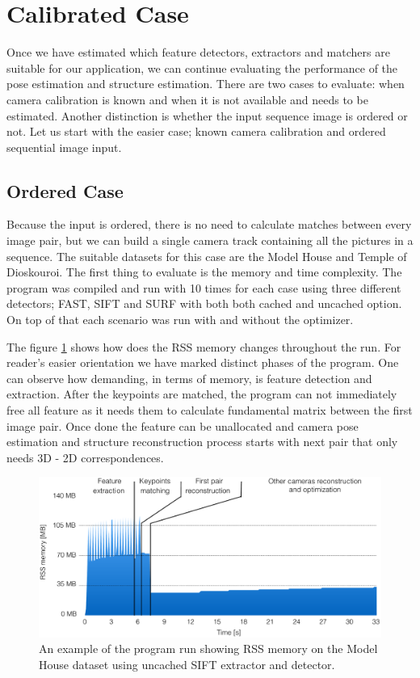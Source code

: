 \section{Calibrated Case}
\label{sec:experiments-calibrated}
Once we have estimated which feature detectors, extractors and matchers are suitable for our application, we can continue evaluating the performance of the pose estimation and structure estimation. There are two cases to evaluate: when camera calibration is known and when it is not available and needs to be estimated.  Another distinction is whether the input sequence image is ordered or not. Let us start with the easier case; known camera calibration and ordered sequential image input.

\subsection*{Ordered Case}
\label{sub:ordered_case}
Because the input is ordered, there is no need to calculate matches between every image pair, but we can build a single camera track containing all the pictures in a sequence. The suitable datasets for this case are the Model House and Temple of Dioskouroi. The first thing to evaluate is the memory and time complexity. The program was compiled and run with 10 times for each case using three different detectors; FAST, SIFT and SURF with both both cached and uncached option. On top of that each scenario was run with and without the optimizer. 

The figure \ref{fig:rss_memory} shows how does the RSS memory changes throughout the run. For reader's easier orientation we have marked distinct phases of the program. One can observe how demanding, in terms of memory, is feature detection and extraction. After the keypoints are matched, the program can not immediately free all feature as it needs them to calculate fundamental matrix between the first image pair. Once done the feature can be unallocated and camera pose estimation and structure reconstruction process starts with next pair that only needs 3D - 2D correspondences.

\begin{figure}[!htbp]
	\begin{center}
		\includegraphics[keepaspectratio,width=\textwidth]{fig/exp_model_house_memory.pdf}
	\end{center}
	\caption{An example of the program run showing RSS memory on the Model House dataset using uncached SIFT extractor and detector.}
	\label{fig:rss_memory}
\end{figure} 


